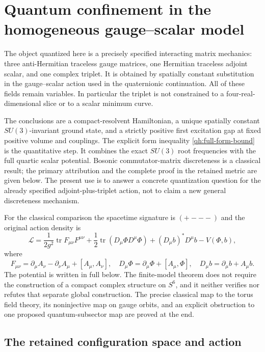 \section{Quantum confinement in the homogeneous gauge--scalar model}
\label{qh:chapter}

The object quantized here is a precisely specified interacting
matrix mechanics: three anti-Hermitian traceless gauge matrices,
one Hermitian traceless adjoint scalar, and one complex triplet.
It is obtained by spatially constant substitution in the gauge--scalar
action used in the quaternionic continuation. All of these fields
remain variables. In particular the triplet is not constrained to a
four-real-dimensional slice or to a scalar minimum curve.

The conclusions are a compact-resolvent Hamiltonian, a unique
spatially constant $SU(3)$-invariant ground state, and a strictly
positive first excitation gap at fixed positive volume and couplings.
The explicit form inequality \eqref{qh:full-form-bound} is the
quantitative step. It combines the exact $SU(3)$ root frequencies
with the full quartic scalar potential. Bosonic commutator-matrix
discreteness is a classical result; the primary attribution and
the complete proof in the retained metric are given below.
The present use is to answer a concrete quantization question for
the already specified adjoint-plus-triplet action, not to claim
a new general discreteness mechanism.

For the classical comparison the spacetime signature is $(+---)$
and the original action density is
\[
 \mathcal L=\frac1{2g^2}\operatorname{tr}F_{\mu\nu}F^{\mu\nu}
       +\frac12\operatorname{tr}(D_\mu\Phi D^\mu\Phi)
       +(D_\mu b)^*D^\mu b-V(\Phi,b),
\]
where
\[
 F_{\mu\nu}=\partial_\mu A_\nu-\partial_\nu A_\mu+[A_\mu,A_\nu],
 \quad D_\mu\Phi=\partial_\mu\Phi+[A_\mu,\Phi],
 \quad D_\mu b=\partial_\mu b+A_\mu b.
\]
The potential is written in full below. The finite-model theorem
does not require the construction of a compact complex structure
on $S^6$, and it neither verifies nor refutes that separate global
construction. The precise classical map to the torus field theory,
its noninjective map on gauge orbits, and an explicit obstruction
to one proposed quantum-subsector map are proved at the end.

\subsection{The retained configuration space and action}

